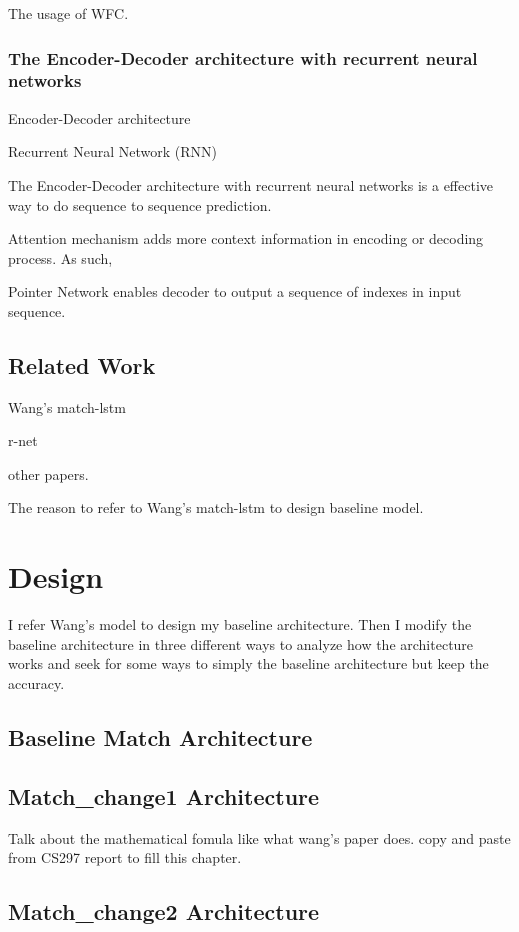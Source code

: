\documentclass[modernstyle,12pt]{sjsuthesis}
\theoremstyle{definition}
\begin{document}
The usage of WFC.

\subsection{The Encoder-Decoder architecture with recurrent neural networks}

Encoder-Decoder architecture

Recurrent Neural Network (RNN)

The Encoder-Decoder architecture with recurrent neural networks is a effective way to do sequence to sequence prediction.

Attention mechanism adds more context information in encoding or decoding process. As such,


Pointer Network enables decoder to output a sequence of indexes in input sequence.

\section{Related Work}
Wang's match-lstm

r-net

other papers.

The reason to refer to Wang's match-lstm to design baseline model.

\chapter{Design}
I refer Wang's model to design my baseline architecture. Then I modify the baseline architecture in three different ways to analyze how the architecture works and seek for some ways to simply the baseline architecture but keep the accuracy.

\section{Baseline Match Architecture}

\section{Match\_change1 Architecture}
Talk about the mathematical fomula like what wang's paper does. copy and paste from CS297 report to fill this chapter.
\section{Match\_change2 Architecture}
\end{document}
